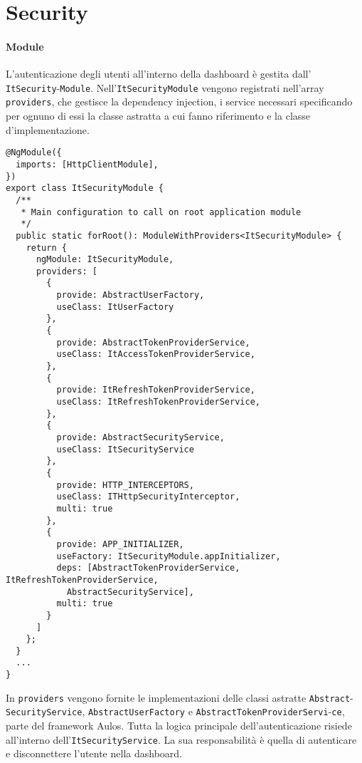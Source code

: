 \section{Security}
\label{chap:security}

\paragraph{Module}
L'autenticazione degli utenti all'interno della dashboard è gestita dall' \verb|ItSecurity|-\verb|Module|. Nell'\verb|ItSecurityModule| vengono registrati nell'array \verb|providers|, che gestisce la dependency injection, i service necessari specificando per ognuno di essi la classe astratta a cui fanno riferimento e la classe d'implementazione.
\begin{lstlisting}[caption={Injection dei service nell'ItSecurityModule}, style=javaScriptCode]
@NgModule({
  imports: [HttpClientModule],
})
export class ItSecurityModule {
  /**
   * Main configuration to call on root application module
   */
  public static forRoot(): ModuleWithProviders<ItSecurityModule> {
    return {
      ngModule: ItSecurityModule,
      providers: [
        {
          provide: AbstractUserFactory,
          useClass: ItUserFactory
        },
        {
          provide: AbstractTokenProviderService,
          useClass: ItAccessTokenProviderService,
        },
        {
          provide: ItRefreshTokenProviderService,
          useClass: ItRefreshTokenProviderService,
        },
        {
          provide: AbstractSecurityService,
          useClass: ItSecurityService
        },
        {
          provide: HTTP_INTERCEPTORS,
          useClass: ITHttpSecurityInterceptor,
          multi: true
        },
        {
          provide: APP_INITIALIZER,
          useFactory: ItSecurityModule.appInitializer,
          deps: [AbstractTokenProviderService, ItRefreshTokenProviderService, 
            AbstractSecurityService],
          multi: true
        }
      ]
    };
  }
  ...
}
\end{lstlisting}
In \verb|providers| vengono fornite le implementazioni delle classi astratte
\verb|Abstract|-\verb|SecurityService|, \verb|AbstractUserFactory| e \verb|AbstractTokenProviderServi|-\verb|ce|, parte del framework Aulos.
Tutta la logica principale dell'autenticazione risiede all'interno dell'\verb|ItSecurityService|. La sua responsabilità è quella di autenticare e disconnettere l'utente nella dashboard. \\
